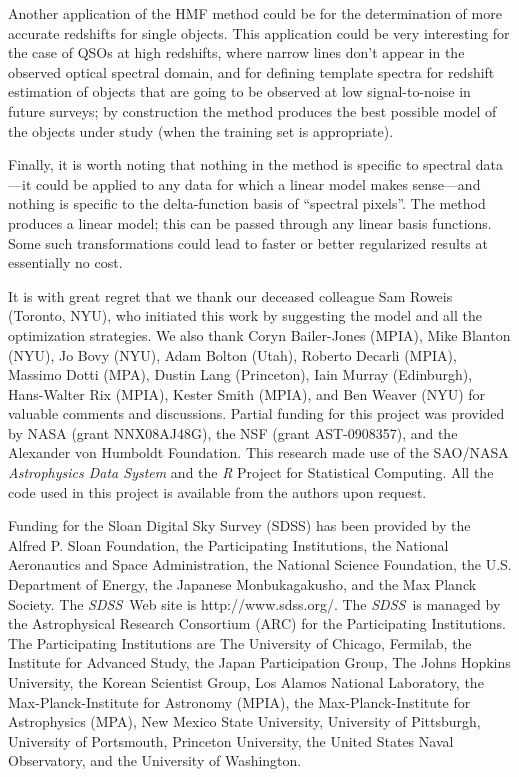 \documentclass[12pt,preprint]{aastex}
\newcommand{\project}[1]{\textsl{#1}}
\newcommand{\sdss}{\project{SDSS}}
\newcommand{\SDSS}{\sdss}
\begin{document}
Another application of the HMF method could be for the determination
of more accurate redshifts for single objects.  This application could
be very interesting for the case of QSOs at high redshifts, where
narrow lines don't appear in the observed optical spectral domain, and for
defining template spectra for redshift estimation of objects that are
going to be observed at low signal-to-noise in future surveys; by
construction the method produces the best possible model of the
objects under study (when the training set is appropriate).

Finally, it is worth noting that nothing in the method is specific to
spectral data---it could be applied to any data for which a linear
model makes sense---and nothing is specific to the delta-function
basis of ``spectral pixels''.  The method produces a linear model;
this can be passed through any linear basis functions.  Some such
transformations could lead to faster or better regularized results at
essentially no cost.

\acknowledgments It is with great regret that we thank our deceased
colleague Sam Roweis (Toronto, NYU), who initiated this work by
suggesting the model and all the optimization strategies.  We also
thank Coryn Bailer-Jones (MPIA), Mike Blanton (NYU), Jo Bovy (NYU),
Adam Bolton (Utah), Roberto Decarli (MPIA), Massimo Dotti (MPA),
Dustin Lang (Princeton), Iain Murray (Edinburgh), Hans-Walter Rix
(MPIA), Kester Smith (MPIA), and Ben Weaver (NYU) for valuable
comments and discussions.  Partial funding for this project was
provided by NASA (grant NNX08AJ48G), the NSF (grant AST-0908357), and
the Alexander von Humboldt Foundation.  This research made use of the
SAO/NASA \project{Astrophysics Data System} and the \project{R}
Project for Statistical Computing.  All the code used in this project
is available from the authors upon request.

Funding for the Sloan Digital Sky Survey (SDSS) has been provided by
the Alfred P. Sloan Foundation, the Participating Institutions, the
National Aeronautics and Space Administration, the National Science
Foundation, the U.S. Department of Energy, the Japanese
Monbukagakusho, and the Max Planck Society. The \SDSS\ Web site is
http://www.sdss.org/. The \SDSS\ is managed by the Astrophysical
Research Consortium (ARC) for the Participating Institutions. The
Participating Institutions are The University of Chicago, Fermilab,
the Institute for Advanced Study, the Japan Participation Group, The
Johns Hopkins University, the Korean Scientist Group, Los Alamos
National Laboratory, the Max-Planck-Institute for Astronomy (MPIA),
the Max-Planck-Institute for Astrophysics (MPA), New Mexico State
University, University of Pittsburgh, University of Portsmouth,
Princeton University, the United States Naval Observatory, and the
University of Washington.
\end{document}
